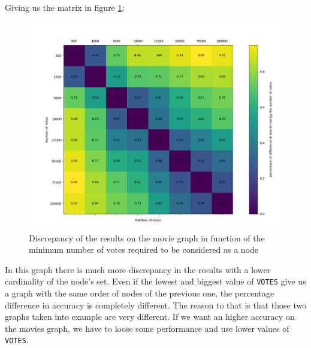 \nd Giving us the matrix in figure \ref{fig:matrix-b}:
\begin{figure}[H]
    \centering
    \includegraphics[width=13cm]{Figure_2.png}
    \caption{Discrepancy of the results on the movie graph in function of the minimum number of votes required to be considered as a node}
    \label{fig:matrix-b}
\end{figure}
\newpage


\s \nd In this graph there is much more discrepancy in the results with a lower cardinality of the node's set. Even if the lowest and biggest value of \texttt{VOTES} give us a graph with the same order of nodes of the previous one, the percentage difference in accuracy is completely different. The reason to that is that those two graphs taken into example are very different. If we want an higher accuracy on the movies graph, we have to loose some performance and use lower values of \texttt{VOTES}.
